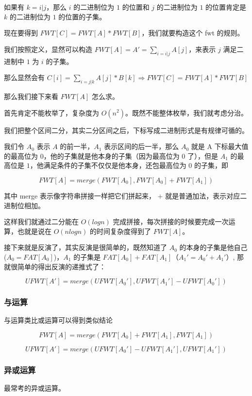 如果有 $k=i|j$，那么 $i$ 的二进制位为 $1$ 的位置和 $j$ 的二进制位为 $1$ 的位置肯定是 $k$ 的二进制位为 $1$ 的位置的子集。

现在要得到 $FWT[C] = FWT[A] * FWT[B]$，我们就要构造这个 fwt 的规则。

我们按照定义，显然可以构造 $FWT[A] = A' = \sum_{i=i|j}A[j]$，来表示 $j$ 满足二进制中 $1$ 为 $i$ 的子集。

那么显然会有 $C[i] = \sum_{i=j|k}A[j]*B[k] \Rightarrow FWT[C] = FWT[A] * FWT[B]$

那么我们接下来看 $FWT[A]$ 怎么求。

首先肯定不能枚举了，复杂度为 $O(n^2)$。既然不能整体枚举，我们就考虑分治。

我们把整个区间二分，其实二分区间之后，下标写成二进制形式是有规律可循的。

我们令 $A_0$ 表示 $A$ 的前一半，$A_1$ 表示区间的后一半，那么 $A_0$ 就是 A 下标最大值的最高位为 $0$，他的子集就是他本身的子集（因为最高位为 $0$ 了），但是 $A_1$ 的最高位是 $1$，他满足条件的子集不仅仅是他本身，还包最高位为 $0$ 的子集，即

$$
FWT[A] = merge(FWT[A_0], FWT[A_0] + FWT[A_1])
$$

其中 merge 表示像字符串拼接一样把它们拼起来， $+$ 就是普通加法，表示对应二进制位相加。

这样我们就通过二分能在 $O(logn)$ 完成拼接，每次拼接的时候要完成一次运算，也就是说在 $O(nlogn)$ 的时间复杂度得到了 $FWT[A]$。

接下来就是反演了，其实反演是很简单的，既然知道了 $A_0$ 的本身的子集是他自己 ($A_0 = FAT[A_0]$)，$A_1$ 的子集是 $FAT[A_0] + FAT[A_1]（A_1'= A_0' + A_1'$）, 那就很简单的得出反演的递推式了：

$$
UFWT[A'] = merge(UFWT[A_0'], UFWT[A_1'] - UFWT[A_0'])
$$

\subsubsection{与运算}

与运算类比或运算可以得到类似结论

$$
FWT[A] = merge(FWT[A_0] + FWT[A_1], FWT[A_1])
$$

$$
UFWT[A'] = merge(UFWT[A_0'] - UFWT[A_1'], UFWT[A_1'])
$$

\subsubsection{异或运算}

最常考的异或运算。

